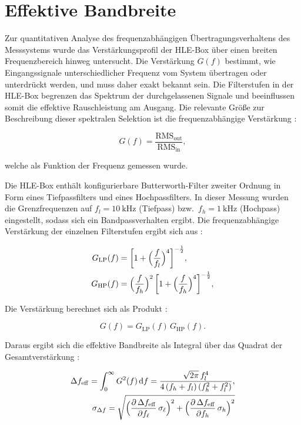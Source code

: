 \chapter{Effektive Bandbreite}

Zur quantitativen Analyse des frequenzabhängigen Übertragungsverhaltens des Messsystems wurde das Verstärkungsprofil der HLE-Box über einen breiten Frequenzbereich hinweg untersucht. 
Die Verstärkung $G(f)$ bestimmt, wie Eingangssignale unterschiedlicher Frequenz vom System übertragen oder unterdrückt werden, und muss daher exakt bekannt sein. 
Die Filterstufen in der HLE-Box begrenzen das Spektrum der durchgelassenen Signale und beeinflussen somit die effektive Rauschleistung am Ausgang. 
Die relevante Größe zur Beschreibung dieser spektralen Selektion ist die frequenzabhängige Verstärkung \cite{praktikum}: 

\begin{equation}
  G(f) = \frac{\mathrm{RMS}_{\mathrm{out}}}{\mathrm{RMS}_{\mathrm{in}}},
\end{equation}

welche als Funktion der Frequenz gemessen wurde.

Die HLE-Box enthält konfigurierbare Butterworth-Filter zweiter Ordnung in Form eines Tiefpassfilters und eines Hochpassfilters. 
In dieser Messung wurden die Grenzfrequenzen auf $f_l = \SI{10}{\kilo\hertz}$ (Tiefpass) bzw.\ $f_h = \SI{1}{\kilo\hertz}$ (Hochpass) eingestellt, sodass sich ein Bandpassverhalten ergibt. 
Die frequenzabhängige Verstärkung der einzelnen Filterstufen ergibt sich aus \cite{praktikum}:

\begin{align}
  G_{\mathrm{LP}}(f) &= \biggl[1 + \Bigl(\frac{f}{f_l}\Bigr)^4\biggr]^{-\frac{1}{2}}, \\
  G_{\mathrm{HP}}(f) &= \Bigl(\frac{f}{f_h}\Bigr)^2 \,\biggl[1 + \Bigl(\frac{f}{f_h}\Bigr)^4\biggr]^{-\frac{1}{2}},
\end{align}

Die Verstärkung berechnet sich als Produkt \cite{praktikum}:

\begin{equation}
  G(f) = G_{\mathrm{LP}}(f)\,G_{\mathrm{HP}}(f).
\end{equation}

Daraus ergibt sich die effektive Bandbreite als Integral über das Quadrat der Gesamtverstärkung \cite{praktikum}:

\begin{equation}
\begin{aligned}
\Delta f_{\mathrm{eff}}
= \int_{0}^{\infty} G^2(f)\,\mathrm{d}f
= \frac{\sqrt{2\pi}\,f_l^4}{4\,(f_h + f_l)\,(f_h^2 + f_l^2)},\\
\sigma_{\Delta f}
= \sqrt{
  \Bigl(\frac{\partial\,\Delta f_{\mathrm{eff}}}{\partial f_\ell}\,\sigma_\ell\Bigr)^{2}
  +\Bigl(\frac{\partial\,\Delta f_{\mathrm{eff}}}{\partial f_h}\,\sigma_h\Bigr)^{2}
}
\end{aligned}
\end{equation}

